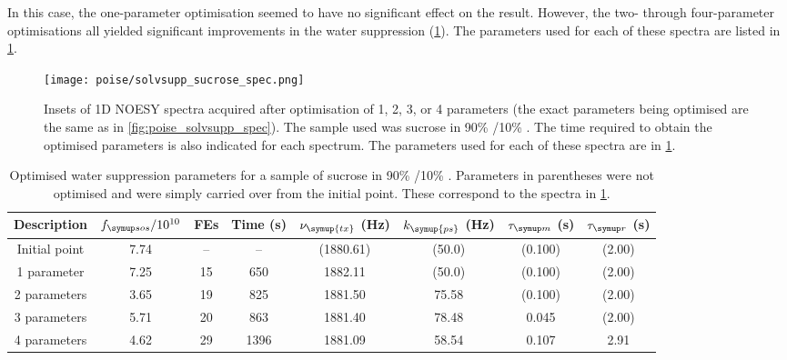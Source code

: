 In this case, the one-parameter optimisation seemed to have no significant effect on the result.
However, the two- through four-parameter optimisations all yielded significant improvements in the water suppression (\cref{fig:poise_solvsupp_sucrose_spec}).
The parameters used for each of these spectra are listed in \cref{tbl:poise_solvsupp_sucrose}.

\begin{figure}[!ht]
    \centering
    \texttt{[image: poise/solvsupp\_sucrose\_spec.png]}
    \caption[1D NOESY spectra of sucrose sample before and after optimisation]{
        Insets of 1D NOESY spectra acquired after optimisation of 1, 2, 3, or 4 parameters (the exact parameters being optimised are the same as in \cref{fig:poise_solvsupp_spec}).
        The sample used was sucrose in 90\% /10\% .
        The time required to obtain the optimised parameters is also indicated for each spectrum.
        The parameters used for each of these spectra are in \cref{tbl:poise_solvsupp_sucrose}.
    }
    \label{fig:poise_solvsupp_sucrose_spec}
\end{figure}

\begin{table}[!htb]
    \centering
    \begin{tabular}{cccccccc}
        \toprule
        Description   & $\fsos / 10^{10}$ & FEs & Time (\unit{\s}) & $\nu_{\symup{tx}}$ (\unit{\Hz}) & $k_{\symup{ps}}$ (\unit{\Hz}) & $\taum$ (\unit{\s}) & $\taur$ (\unit{\s}) \\
        \hline
        Initial point & 7.74 & -- & --   & (1880.61) & (50.0) & (0.100) & (2.00) \\
        1 parameter   & 7.25 & 15 & 650  & 1882.11   & (50.0) & (0.100) & (2.00) \\
        2 parameters  & 3.65 & 19 & 825  & 1881.50   & 75.58  & (0.100) & (2.00) \\
        3 parameters  & 5.71 & 20 & 863  & 1881.40   & 78.48  & 0.045   & (2.00) \\
        4 parameters  & 4.62 & 29 & 1396 & 1881.09   & 58.54  & 0.107   & 2.91   \\
        \hline
    \end{tabular}
    \caption[Overview of water suppression optimisations on sucrose sample]{
        Optimised water suppression parameters for a sample of sucrose in 90\% /10\% .
        Parameters in parentheses were not optimised and were simply carried over from the initial point.
        These correspond to the spectra in \cref{fig:poise_solvsupp_sucrose_spec}.
    }
    \label{tbl:poise_solvsupp_sucrose}
\end{table}
